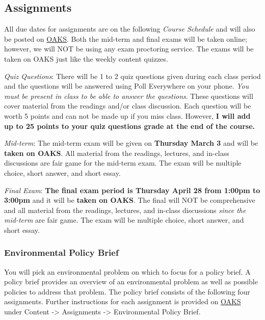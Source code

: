 \hypertarget{assignments}{%
\subsection{Assignments}\label{assignments}}

All due dates for assignments are on the following \emph{Course
Schedule} and will also be posted on \href{https://lms.cofc.edu}{OAKS}.
Both the mid-term and final exams will be taken online; however, we will
NOT be using any exam proctoring service. The exams will be taken on
OAKS just like the weekly content quizzes.

\vspace{0.1in}

\noindent \emph{Quiz Questions}: There will be 1 to 2 quiz questions
given during each class period and the questions will be answered using
Poll Everywhere on your phone. \emph{You must be present in class to be
able to answer the questions}. These questions will cover material from
the readings and/or class discussion. Each question will be worth 5
points and can not be made up if you miss class. However, \textbf{I will
add up to 25 points to your quiz questions grade at the end of the
course.}

\vspace{0.1in}

\noindent \emph{Mid-term}: The mid-term exam will be given on
\textbf{Thursday March 3} and will be \textbf{taken on OAKS}. All
material from the readings, lectures, and in-class discussions are fair
game for the mid-term exam. The exam will be multiple choice, short
answer, and short essay.

\vspace{0.1in}

\noindent \emph{Final Exam}: \textbf{The final exam period is Thursday
April 28 from 1:00pm to 3:00pm} and it will be \textbf{taken on OAKS}.
The final will NOT be comprehensive and all material from the readings,
lectures, and in-class discussions \emph{since the mid-term} are fair
game. The exam will be multiple choice, short answer, and short essay.

\hypertarget{environmental-policy-brief}{%
\subsubsection{Environmental Policy
Brief}\label{environmental-policy-brief}}

You will pick an environmental problem on which to focus for a policy
brief. A policy brief provides an overview of an environmental problem
as well as possible policies to address that problem. The policy brief
consists of the following four assignments. Further instructions for
each assignment is provided on \href{https://lms.cofc.edu}{OAKS} under
Content -\textgreater{} Assignments -\textgreater{} Environmental Policy
Brief.

